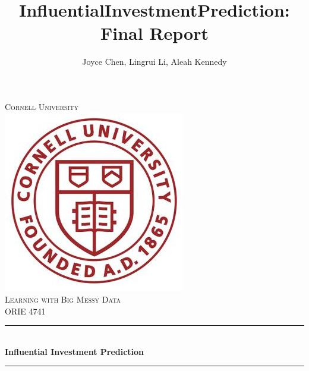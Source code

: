 \documentclass{article}
\title{InfluentialInvestmentPrediction: Final Report}
\author{Joyce Chen, Lingrui Li, Aleah Kennedy}
\begin{document}
\begin{titlepage}

\newcommand{\HRule}{\rule{\linewidth}{0.5mm}} %

\center %
 

\textsc{\LARGE Cornell University}\\[1.5cm] %
\includegraphics[scale=.5]{cornell_logo.jpg}\\[1cm] %
\textsc{\Large Learning with Big Messy Data}\\[0.5cm] %
\textsc{\large ORIE 4741}\\[0.5cm] %


\HRule \\[0.4cm]
{ \huge \bfseries Influential Investment Prediction}\\[0.4cm] %
\HRule \\[1.5cm]
 


\end{titlepage}
\end{document}
